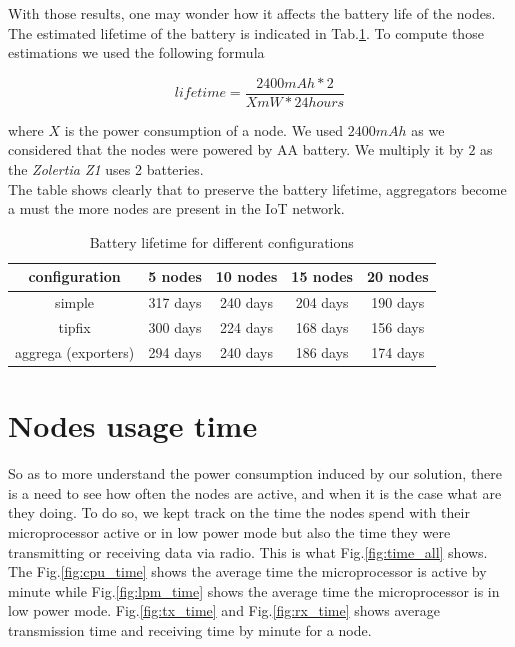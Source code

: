With those results, one may wonder how it affects the battery life of the nodes. The estimated lifetime of the battery is indicated in Tab.\ref{tab:battery_lifetime}. To compute those estimations we used the following formula

\begin{equation}
  lifetime = \frac{2400 mAh * 2}{X mW * 24 hours}
\end{equation}

where $X$ is the power consumption of a node. We used $2400mAh$ as we considered that the nodes were powered by AA battery. We multiply it by $2$ as the \textit{Zolertia Z1} uses 2 batteries. \\

The table shows clearly that to preserve the battery lifetime, aggregators become a must the more nodes are present in the IoT network.

\begin{table}
  \centering
  \begin{tabular}{|c|c|c|c|c|}
    \hline
    configuration & 5 nodes & 10 nodes & 15 nodes & 20 nodes \\
    \hline
    simple & 317 days & 240 days & 204 days & 190 days\\
    \hline
    tipfix & 300 days & 224 days & 168 days & 156 days\\
    \hline
    aggrega (exporters) & 294 days & 240 days & 186 days & 174 days \\
    \hline
  \end{tabular}
  \caption{Battery lifetime for different configurations}
  \label{tab:battery_lifetime}
\end{table}

\section*{Nodes usage time}

So as to more understand the power consumption induced by our solution, there is a need to see how often the nodes are active, and when it is the case what are they doing. To do so, we kept track on the time the nodes spend with their microprocessor active or in low power mode but also the time they were transmitting or receiving data via radio. This is what Fig.\ref{fig:time_all} shows. The Fig.\ref{fig:cpu_time} shows the average time the microprocessor is active by minute while Fig.\ref{fig:lpm_time} shows the average time the microprocessor is in low power mode. Fig.\ref{fig:tx_time} and Fig.\ref{fig:rx_time} shows average transmission time and receiving time by minute for a node. \\

